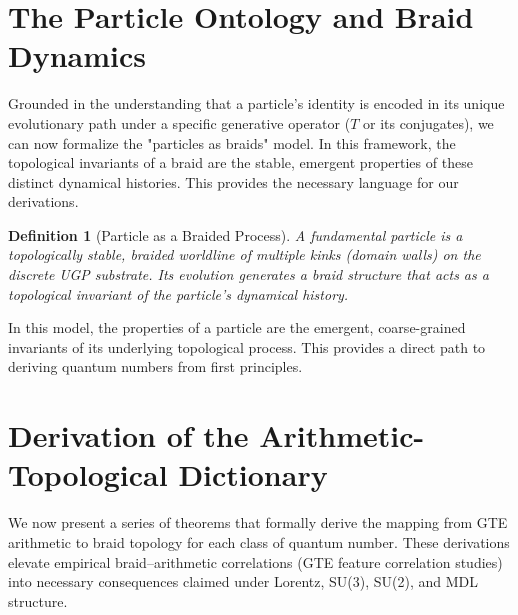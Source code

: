 \documentclass[11pt]{article}
\newtheorem{definition}[theorem]{Definition}
\theoremstyle{remark}
\begin{document}
\section{The Particle Ontology and Braid Dynamics}
\label{sec:ontology}

Grounded in the understanding that a particle's identity is encoded in its unique evolutionary path under a specific generative operator ($T$ or its conjugates), we can now formalize the "particles as braids" model. In this framework, the topological invariants of a braid are the stable, emergent properties of these distinct dynamical histories. This provides the necessary language for our derivations.

\begin{definition}[Particle as a Braided Process]
A fundamental particle is a topologically stable, braided worldline of multiple kinks (domain walls) on the discrete UGP substrate. Its evolution generates a braid structure that acts as a topological invariant of the particle's dynamical history.
\end{definition}

In this model, the properties of a particle are the emergent, coarse-grained invariants of its underlying topological process. This provides a direct path to deriving quantum numbers from first principles.

\section{Derivation of the Arithmetic-Topological Dictionary}
\label{sec:derivation}

We now present a series of theorems that formally derive the mapping from GTE arithmetic to braid topology for each class of quantum number. These derivations elevate empirical braid--arithmetic correlations (GTE feature correlation studies) into necessary consequences claimed under Lorentz, SU(3), SU(2), and MDL structure.
\end{document}

